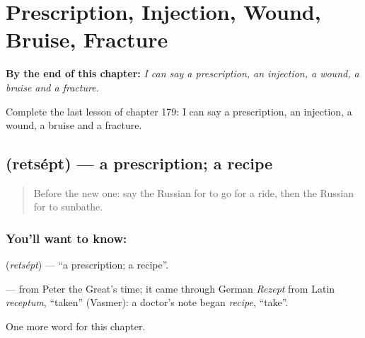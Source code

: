 
\chapter{Prescription, Injection, Wound, Bruise, Fracture}
\label{ch:ru-prescription-injection-wound-bruise-fracture}

\begin{chapteropening}
\textbf{By the end of this chapter:} \emph{I can say a prescription, an injection, a wound, a bruise and a fracture.}

Complete the last lesson of chapter 179: I can say a prescription, an injection, a wound, a bruise and a fracture.
\end{chapteropening}

\section[\texorpdfstring{\ru{рецепт} (retsépt)}{рецепт (retsépt)}]{ (retsépt) — a prescription; a recipe}

\label{lesson:RU-C179-retsept}



\begin{quote}
Before the new one: say the Russian for to go for a ride, then the Russian for to sunbathe.
\end{quote}

\subsection*{You'll want to know: }
\textbf{} (\emph{retsépt}) — \textquotedblleft{}a prescription; a recipe\textquotedblright{}.

\begin{cousinweb}
\textbf{} — from Peter the Great's time; it came through German \emph{Rezept} from Latin \emph{receptum}, \textquotedblleft{}taken\textquotedblright{} (Vasmer): a doctor's note began \emph{recipe}, \textquotedblleft{}take\textquotedblright{}.
\end{cousinweb}

\begin{grammarlens}[title={What you've built}]
One more word for this chapter.
\end{grammarlens}

